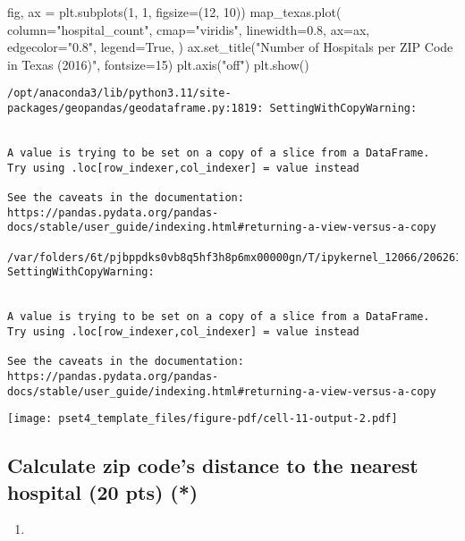 \documentclass[
  letterpaper,
  DIV=11,
  numbers=noendperiod]{scrartcl}
\newenvironment{Shaded}{\begin{snugshade}}{\end{snugshade}}
\newcommand{\DecValTok}[1]{\textcolor[rgb]{0.68,0.00,0.00}{#1}}
\newcommand{\FloatTok}[1]{\textcolor[rgb]{0.68,0.00,0.00}{#1}}
\newcommand{\NormalTok}[1]{\textcolor[rgb]{0.00,0.23,0.31}{#1}}
\newcommand{\OperatorTok}[1]{\textcolor[rgb]{0.37,0.37,0.37}{#1}}
\newcommand{\StringTok}[1]{\textcolor[rgb]{0.13,0.47,0.30}{#1}}
\newcommand{\VariableTok}[1]{\textcolor[rgb]{0.07,0.07,0.07}{#1}}
\providecommand{\tightlist}{%
  \setlength{\itemsep}{0pt}\setlength{\parskip}{0pt}}\usepackage{longtable,booktabs,array}
\begin{document}
\begin{Shaded}
\begin{Highlighting}[]
\NormalTok{fig, ax }\OperatorTok{=}\NormalTok{ plt.subplots(}\DecValTok{1}\NormalTok{, }\DecValTok{1}\NormalTok{, figsize}\OperatorTok{=}\NormalTok{(}\DecValTok{12}\NormalTok{, }\DecValTok{10}\NormalTok{))}
\NormalTok{map\_texas.plot(}
\NormalTok{    column}\OperatorTok{=}\StringTok{"hospital\_count"}\NormalTok{,}
\NormalTok{    cmap}\OperatorTok{=}\StringTok{"viridis"}\NormalTok{,}
\NormalTok{    linewidth}\OperatorTok{=}\FloatTok{0.8}\NormalTok{,}
\NormalTok{    ax}\OperatorTok{=}\NormalTok{ax,}
\NormalTok{    edgecolor}\OperatorTok{=}\StringTok{"0.8"}\NormalTok{,}
\NormalTok{    legend}\OperatorTok{=}\VariableTok{True}\NormalTok{,}
\NormalTok{)}
\NormalTok{ax.set\_title(}\StringTok{"Number of Hospitals per ZIP Code in Texas (2016)"}\NormalTok{, fontsize}\OperatorTok{=}\DecValTok{15}\NormalTok{)}
\NormalTok{plt.axis(}\StringTok{"off"}\NormalTok{)}
\NormalTok{plt.show()}
\end{Highlighting}
\end{Shaded}

\begin{verbatim}
/opt/anaconda3/lib/python3.11/site-packages/geopandas/geodataframe.py:1819: SettingWithCopyWarning:


A value is trying to be set on a copy of a slice from a DataFrame.
Try using .loc[row_indexer,col_indexer] = value instead

See the caveats in the documentation: https://pandas.pydata.org/pandas-docs/stable/user_guide/indexing.html#returning-a-view-versus-a-copy

/var/folders/6t/pjbppdks0vb8q5hf3h8p6mx00000gn/T/ipykernel_12066/2062616165.py:15: SettingWithCopyWarning:


A value is trying to be set on a copy of a slice from a DataFrame.
Try using .loc[row_indexer,col_indexer] = value instead

See the caveats in the documentation: https://pandas.pydata.org/pandas-docs/stable/user_guide/indexing.html#returning-a-view-versus-a-copy
\end{verbatim}

\texttt{[image: pset4\_template\_files/figure-pdf/cell-11-output-2.pdf]}

\subsection{Calculate zip code's distance to the nearest hospital (20
pts)
(*)}\label{calculate-zip-codes-distance-to-the-nearest-hospital-20-pts}

\begin{enumerate}
\def\labelenumi{\arabic{enumi}.}
\tightlist
\item
\end{enumerate}
\end{document}
